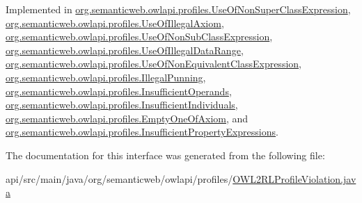 Implemented in \hyperlink{classorg_1_1semanticweb_1_1owlapi_1_1profiles_1_1_use_of_non_super_class_expression_aa43200d8d98d6a60dcbcc32806fb14da}{org.\-semanticweb.\-owlapi.\-profiles.\-Use\-Of\-Non\-Super\-Class\-Expression}, \hyperlink{classorg_1_1semanticweb_1_1owlapi_1_1profiles_1_1_use_of_illegal_axiom_ac9ca566224e3ba8ebf82d2a2524d6bcf}{org.\-semanticweb.\-owlapi.\-profiles.\-Use\-Of\-Illegal\-Axiom}, \hyperlink{classorg_1_1semanticweb_1_1owlapi_1_1profiles_1_1_use_of_non_sub_class_expression_abd322abca89ccbbec465c7fd32077238}{org.\-semanticweb.\-owlapi.\-profiles.\-Use\-Of\-Non\-Sub\-Class\-Expression}, \hyperlink{classorg_1_1semanticweb_1_1owlapi_1_1profiles_1_1_use_of_illegal_data_range_a09e72c1a9bf32a4d31f2f3dd9e24fce1}{org.\-semanticweb.\-owlapi.\-profiles.\-Use\-Of\-Illegal\-Data\-Range}, \hyperlink{classorg_1_1semanticweb_1_1owlapi_1_1profiles_1_1_use_of_non_equivalent_class_expression_a6b5103940b83909aec64a0b4d57f3b8f}{org.\-semanticweb.\-owlapi.\-profiles.\-Use\-Of\-Non\-Equivalent\-Class\-Expression}, \hyperlink{classorg_1_1semanticweb_1_1owlapi_1_1profiles_1_1_illegal_punning_aae704f42e06df8939379f875866be1e3}{org.\-semanticweb.\-owlapi.\-profiles.\-Illegal\-Punning}, \hyperlink{classorg_1_1semanticweb_1_1owlapi_1_1profiles_1_1_insufficient_operands_a05e82363d62adabd687a883bd1758a40}{org.\-semanticweb.\-owlapi.\-profiles.\-Insufficient\-Operands}, \hyperlink{classorg_1_1semanticweb_1_1owlapi_1_1profiles_1_1_insufficient_individuals_a755fcfab3bdc5cb3002315d1520828f8}{org.\-semanticweb.\-owlapi.\-profiles.\-Insufficient\-Individuals}, \hyperlink{classorg_1_1semanticweb_1_1owlapi_1_1profiles_1_1_empty_one_of_axiom_a29a2383e86e5497767cb7dd4ab0def5f}{org.\-semanticweb.\-owlapi.\-profiles.\-Empty\-One\-Of\-Axiom}, and \hyperlink{classorg_1_1semanticweb_1_1owlapi_1_1profiles_1_1_insufficient_property_expressions_ae4b980fa27b02ccf70b3c8e7e65f6241}{org.\-semanticweb.\-owlapi.\-profiles.\-Insufficient\-Property\-Expressions}.



The documentation for this interface was generated from the following file\-:\begin{DoxyCompactItemize}
\item 
api/src/main/java/org/semanticweb/owlapi/profiles/\hyperlink{_o_w_l2_r_l_profile_violation_8java}{O\-W\-L2\-R\-L\-Profile\-Violation.\-java}\end{DoxyCompactItemize}
